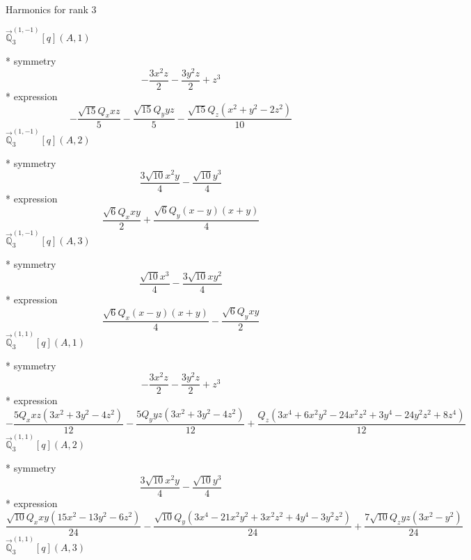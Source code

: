 \documentclass[fleqn,8pt]{jsarticle}
\begin{document}
\noindent * Harmonics for rank 3

\noindent\quad $\vec{\mathbb{Q}}_{3}^{(1,-1)}[q](A,1)$

\noindent\quad ** symmetry
\begin{dmath*}
- \frac{3 x^{2} z}{2} - \frac{3 y^{2} z}{2} + z^{3}
\end{dmath*}
\noindent\quad ** expression
\begin{dmath*}
- \frac{\sqrt{15} Q_{x} x z}{5} - \frac{\sqrt{15} Q_{y} y z}{5} - \frac{\sqrt{15} Q_{z} \left(x^{2} + y^{2} - 2 z^{2}\right)}{10}
\end{dmath*}
\noindent\quad $\vec{\mathbb{Q}}_{3}^{(1,-1)}[q](A,2)$

\noindent\quad ** symmetry
\begin{dmath*}
\frac{3 \sqrt{10} x^{2} y}{4} - \frac{\sqrt{10} y^{3}}{4}
\end{dmath*}
\noindent\quad ** expression
\begin{dmath*}
\frac{\sqrt{6} Q_{x} x y}{2} + \frac{\sqrt{6} Q_{y} \left(x - y\right) \left(x + y\right)}{4}
\end{dmath*}
\noindent\quad $\vec{\mathbb{Q}}_{3}^{(1,-1)}[q](A,3)$

\noindent\quad ** symmetry
\begin{dmath*}
\frac{\sqrt{10} x^{3}}{4} - \frac{3 \sqrt{10} x y^{2}}{4}
\end{dmath*}
\noindent\quad ** expression
\begin{dmath*}
\frac{\sqrt{6} Q_{x} \left(x - y\right) \left(x + y\right)}{4} - \frac{\sqrt{6} Q_{y} x y}{2}
\end{dmath*}
\noindent\quad $\vec{\mathbb{Q}}_{3}^{(1,1)}[q](A,1)$

\noindent\quad ** symmetry
\begin{dmath*}
- \frac{3 x^{2} z}{2} - \frac{3 y^{2} z}{2} + z^{3}
\end{dmath*}
\noindent\quad ** expression
\begin{dmath*}
- \frac{5 Q_{x} x z \left(3 x^{2} + 3 y^{2} - 4 z^{2}\right)}{12} - \frac{5 Q_{y} y z \left(3 x^{2} + 3 y^{2} - 4 z^{2}\right)}{12} + \frac{Q_{z} \left(3 x^{4} + 6 x^{2} y^{2} - 24 x^{2} z^{2} + 3 y^{4} - 24 y^{2} z^{2} + 8 z^{4}\right)}{12}
\end{dmath*}
\noindent\quad $\vec{\mathbb{Q}}_{3}^{(1,1)}[q](A,2)$

\noindent\quad ** symmetry
\begin{dmath*}
\frac{3 \sqrt{10} x^{2} y}{4} - \frac{\sqrt{10} y^{3}}{4}
\end{dmath*}
\noindent\quad ** expression
\begin{dmath*}
\frac{\sqrt{10} Q_{x} x y \left(15 x^{2} - 13 y^{2} - 6 z^{2}\right)}{24} - \frac{\sqrt{10} Q_{y} \left(3 x^{4} - 21 x^{2} y^{2} + 3 x^{2} z^{2} + 4 y^{4} - 3 y^{2} z^{2}\right)}{24} + \frac{7 \sqrt{10} Q_{z} y z \left(3 x^{2} - y^{2}\right)}{24}
\end{dmath*}
\noindent\quad $\vec{\mathbb{Q}}_{3}^{(1,1)}[q](A,3)$
\end{document}
